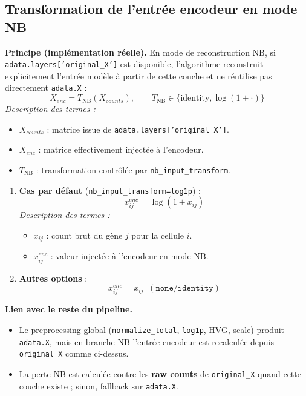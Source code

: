 \documentclass[11pt,a4paper]{article}
\begin{document}
\subsection{Transformation de l'entr\'ee encodeur en mode NB}

\textbf{Principe (impl\'ementation r\'eelle).} En mode de reconstruction NB, si \texttt{adata.layers['original\_X']} est disponible, l'algorithme reconstruit explicitement l'entr\'ee mod\`ele \`a partir de cette couche et ne r\'eutilise pas directement \texttt{adata.X} :
\[
  X_{enc} = T_{\text{NB}}(X_{counts}), \qquad T_{\text{NB}} \in \{\mathrm{identity},\log(1+\cdot)\}
\]
\textit{Description des termes :}
\begin{itemize}[nosep]
  \item $X_{counts}$ : matrice issue de \texttt{adata.layers['original\_X']}.
  \item $X_{enc}$ : matrice effectivement inject\'ee \`a l'encodeur.
  \item $T_{\text{NB}}$ : transformation contr\^ol\'ee par \texttt{nb\_input\_transform}.
\end{itemize}

\begin{enumerate}[nosep]
  \item \textbf{Cas par d\'efaut} (\texttt{nb\_input\_transform=log1p}) :
  \[
    x^{enc}_{ij} = \log(1 + x_{ij})
  \]
  \textit{Description des termes :}
  \begin{itemize}[nosep]
    \item $x_{ij}$ : count brut du g\`ene $j$ pour la cellule $i$.
    \item $x^{enc}_{ij}$ : valeur inject\'ee \`a l'encodeur en mode NB.
  \end{itemize}
  \item \textbf{Autres options} :
  \[
    x^{enc}_{ij}=x_{ij} \;\; (\texttt{none/identity})
  \]
\end{enumerate}

\textbf{Lien avec le reste du pipeline.}
\begin{itemize}[nosep]
  \item Le preprocessing global (\texttt{normalize\_total}, \texttt{log1p}, HVG, scale) produit \texttt{adata.X}, mais en branche NB l'entr\'ee encodeur est recalcul\'ee depuis \texttt{original\_X} comme ci-dessus.
  \item La perte NB est calcul\'ee contre les \textbf{raw counts} de \texttt{original\_X} quand cette couche existe ; sinon, fallback sur \texttt{adata.X}.
\end{itemize}
\end{document}
